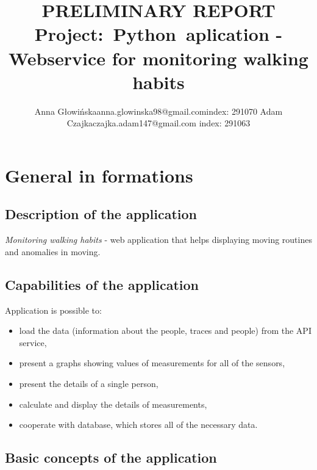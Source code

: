 \documentclass[a4paper,12pt,oneside]{article}
\begin{document}
\makeatother


\title{PRELIMINARY REPORT\\Project:~Python~aplication - Webservice for monitoring walking habits}

\author{Anna Głowińska\newline anna.glowinska98@gmail.com\newline index: 291070 \newline \newline
Adam Czajka\newline czajka.adam147@gmail.com \newline index: 291063}

\maketitle
\tableofcontents
\thispagestyle{fancy}
\newpage

\section{General in formations}
\subsection{Description of the application}

\textit{Monitoring walking habits} - web application that helps displaying moving routines and anomalies in moving.

\subsection{Capabilities of the application}

Application is possible to:
\begin{itemize}
\item load the data (information about the people, traces and people) from the API service,
\item present a graphs showing values of measurements for all of the sensors,
\item present the details of a single person,
\item calculate and display the details of measurements,
\item cooperate with database, which stores all of the necessary data.
\end{itemize}
\subsection{Basic concepts of the application}
\end{document}
